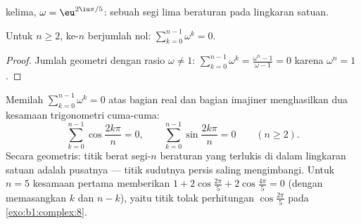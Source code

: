 \begin{omfigure}

{\small {} kelima, $\omega = \eu^{2\iu\pi/5}$: sebuah
segi lima beraturan pada lingkaran satuan.}
\end{omfigure}

\begin{proposition}\label{prop:b1:complex:sumroots}
Untuk $n \geq 2$,  ke-$n$ berjumlah nol:
$\sum_{k=0}^{n-1} \omega^k = 0$.
\end{proposition}

\begin{proof}
Jumlah geometri dengan rasio $\omega \neq 1$:
$\sum_{k=0}^{n-1} \omega^k = \frac{\omega^n - 1}{\omega - 1} = 0$
karena $\omega^n = 1$.
\end{proof}

\begin{example}\label{ex:b1:complex:sumrootsparts}
Memilah $\sum_{k=0}^{n-1}\omega^k = 0$ atas bagian real dan bagian
imajiner menghasilkan dua kesamaan trigonometri cuma-cuma:
\[
\sum_{k=0}^{n-1}\cos\frac{2k\pi}n = 0,
\qquad
\sum_{k=0}^{n-1}\sin\frac{2k\pi}n = 0
\qquad (n \geq 2).
\]
Secara geometris: titik berat segi-$n$ beraturan yang terlukis di dalam
lingkaran satuan adalah pusatnya --- titik sudutnya persis saling mengimbangi.
Untuk $n = 5$ kesamaan pertama memberikan $1 + 2\cos\frac{2\pi}5 +
2\cos\frac{4\pi}5 = 0$ (dengan memasangkan $k$ dan $n - k$), yaitu titik
tolak perhitungan
$\cos\frac{2\pi}5$ pada \cref{exo:b1:complex:8}.
\end{example}


